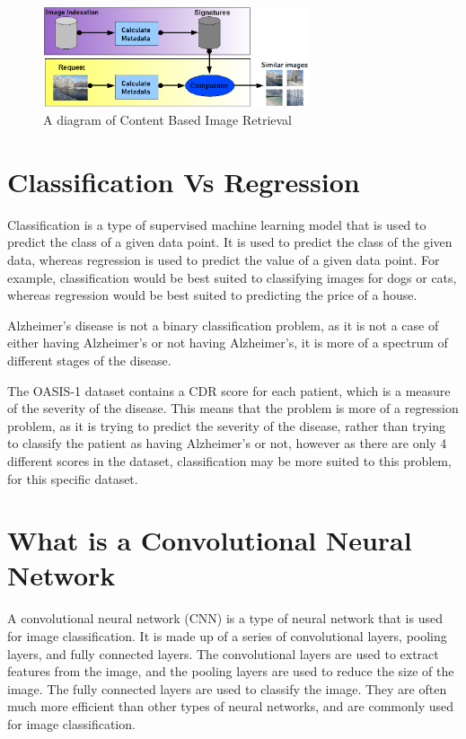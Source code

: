 \documentclass[]{final_report}
\begin{document}
\begin{figure}[h]
  \centering
  \includegraphics[width=0.7\textwidth]{images/Principe_cbir.png}
  \caption{A diagram of Content Based Image Retrieval \cite{ContentBasedImageRetrieval}}
\end{figure}

\section{Classification Vs Regression}

Classification is a type of supervised machine learning model that is used to predict the class of a given data point.
It is used to predict the class of the given data, whereas regression is used to predict the value of a given data point.
For example, classification would be best suited to classifying images for dogs or cats, whereas regression would be best suited to predicting the price of a house.

Alzheimer's disease is not a binary classification problem, as it is not a case of either having Alzheimer's or not having Alzheimer's, it is more of a spectrum of different stages of the disease.

The OASIS-1 dataset contains a CDR score for each patient, which is a measure of the severity of the disease. This means that the problem is more of a regression problem, as it is trying to predict the severity of the disease, rather than trying to classify the patient as having Alzheimer's or not, however as there are only 4 different scores in the dataset, classification may be more suited to this problem, for this specific dataset.

\section{What is a Convolutional Neural Network}
A convolutional neural network (CNN) is a type of neural network that is used for image classification.
It is made up of a series of convolutional layers, pooling layers, and fully connected layers.
The convolutional layers are used to extract features from the image, and the pooling layers are used to reduce the size of the image.
The fully connected layers are used to classify the image.
They are often much more efficient than other types of neural networks, and are commonly used for image classification.
\end{document}
